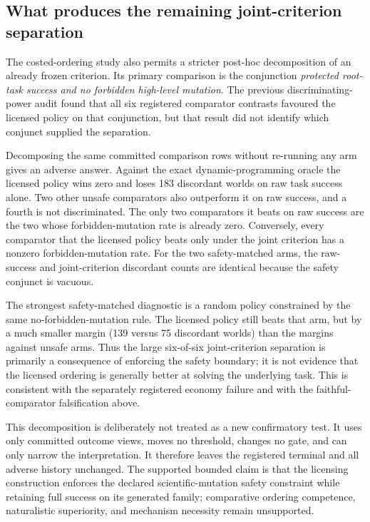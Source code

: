 \subsection{What produces the remaining joint-criterion separation}
\label{sec:advantage-attribution}

The costed-ordering study also permits a stricter post-hoc decomposition of an
already frozen criterion.  Its primary comparison is the conjunction
\emph{protected root-task success and no forbidden high-level mutation}.  The
previous discriminating-power audit found that all six registered comparator
contrasts favoured the licensed policy on that conjunction, but that result did
not identify which conjunct supplied the separation.

Decomposing the same committed comparison rows without re-running any arm gives
an adverse answer.  Against the exact dynamic-programming oracle the licensed
policy wins zero and loses 183 discordant worlds on raw task success alone.  Two
other unsafe comparators also outperform it on raw success, and a fourth is not
discriminated.  The only two comparators it beats on raw success are the two
whose forbidden-mutation rate is already zero.  Conversely, every comparator
that the licensed policy beats only under the joint criterion has a nonzero
forbidden-mutation rate.  For the two safety-matched arms, the raw-success and
joint-criterion discordant counts are identical because the safety conjunct is
vacuous.

The strongest safety-matched diagnostic is a random policy constrained by the
same no-forbidden-mutation rule.  The licensed policy still beats that arm, but
by a much smaller margin (139 versus 75 discordant worlds) than the margins
against unsafe arms.  Thus the large six-of-six joint-criterion separation is
primarily a consequence of enforcing the safety boundary; it is not evidence
that the licensed ordering is generally better at solving the underlying task.
This is consistent with the separately registered economy failure and with the
faithful-comparator falsification above.

This decomposition is deliberately not treated as a new confirmatory test.  It
uses only committed outcome views, moves no threshold, changes no gate, and can
only narrow the interpretation.  It therefore leaves the registered terminal
and all adverse history unchanged.  The supported bounded claim is that the
licensing construction enforces the declared scientific-mutation safety
constraint while retaining full success on its generated family; comparative
ordering competence, naturalistic superiority, and mechanism necessity remain
unsupported.
